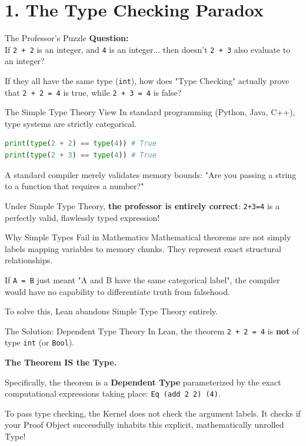 \documentclass[10pt,aspectratio=169]{beamer}
\begin{document}
\section{1. The Type Checking Paradox}

\begin{frame}[fragile]{The Professor's Puzzle}
    \textbf{Question:} \\
    If \verb|2 + 2| is an integer, and \verb|4| is an integer... then doesn't \verb|2 + 3| also evaluate to an integer? 
    
    If they all have the same type (\verb|int|), how does "Type Checking" actually prove that \verb|2 + 2 = 4| is true, while \verb|2 + 3 = 4| is false?
\end{frame}

\begin{frame}[fragile]{The Simple Type Theory View}
    In standard programming (Python, Java, C++), type systems are strictly categorical.
    
    \begin{lstlisting}[language=Python]
print(type(2 + 2) == type(4)) # True
print(type(2 + 3) == type(4)) # True
    \end{lstlisting}
    
    A standard compiler merely validates memory bounds: "Are you passing a string to a function that requires a number?" 
    
    Under Simple Type Theory, \textbf{the professor is entirely correct}: \verb|2+3=4| is a perfectly valid, flawlessly typed expression!
\end{frame}

\begin{frame}[fragile]{Why Simple Types Fail in Mathematics}
    Mathematical theorems are not simply labels mapping variables to memory chunks. They represent exact structural relationships.
    
    If \verb|A = B| just meant "A and B have the same categorical label", the compiler would have no capability to differentiate truth from falsehood.
    
    To solve this, Lean abandons Simple Type Theory entirely.
\end{frame}

\begin{frame}[fragile]{The Solution: Dependent Type Theory}
    In Lean, the theorem \verb|2 + 2 = 4| is \textbf{not} of type \verb|int| (or \verb|Bool|).
    
    \vspace{1em}
    \textbf{The Theorem IS the Type.}
    
    \vspace{1em}
    Specifically, the theorem is a \textbf{Dependent Type} parameterized by the exact computational expressions taking place: \verb|Eq (add 2 2) (4)|.
    
    To pass type checking, the Kernel does not check the argument labels. It checks if your Proof Object successfully inhabits this explicit, mathematically unrolled Type!
\end{frame}
\end{document}

